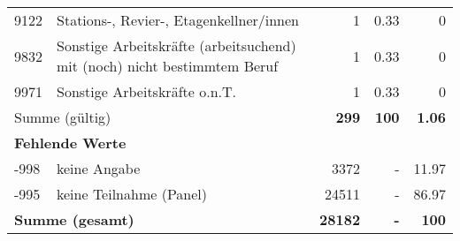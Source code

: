 \begin{longtable}{lXrrr}
        9122 & \multicolumn{1}{X}{Stations-, Revier-, Etagenkellner/innen} & %
          \num{1} &
          \num[round-mode=places,round-precision=2]{0.33} &
          \num[round-mode=places,round-precision=2]{0} \\

        9832 & \multicolumn{1}{X}{Sonstige Arbeitskräfte (arbeitsuchend) mit (noch) nicht bestimmtem Beruf} & %
          \num{1} &
          \num[round-mode=places,round-precision=2]{0.33} &
          \num[round-mode=places,round-precision=2]{0} \\

        9971 & \multicolumn{1}{X}{Sonstige Arbeitskräfte o.n.T.} & %
          \num{1} &
          \num[round-mode=places,round-precision=2]{0.33} &
          \num[round-mode=places,round-precision=2]{0} \\

     \midrule
     \multicolumn{2}{l}{Summe (gültig)} &
       \textbf{\num{299}} &
     \textbf{\num{100}} &
       \textbf{\num[round-mode=places,round-precision=2]{1.06}} \\
     \multicolumn{5}{l}{\textbf{Fehlende Werte}}\\
       -998 &
       keine Angabe &
         \num{3372} &
        - &
         \num[round-mode=places,round-precision=2]{11.97} \\
       -995 &
       keine Teilnahme (Panel) &
         \num{24511} &
        - &
         \num[round-mode=places,round-precision=2]{86.97} \\
     \midrule
     \multicolumn{2}{l}{\textbf{Summe (gesamt)}} &
          \textbf{\num{28182}} &
        \textbf{-} &
        \textbf{\num{100}} \\
     \bottomrule
     \end{longtable}
     
